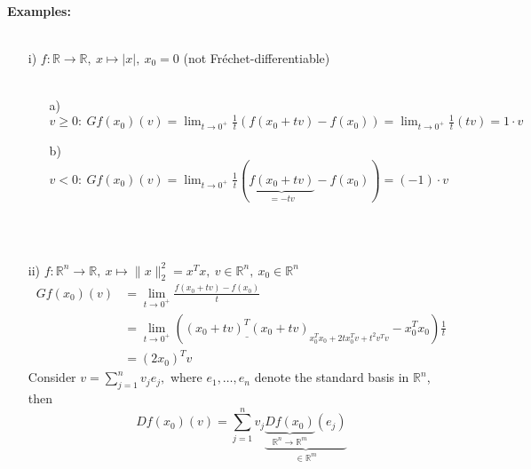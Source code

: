 \begin{frame}
~\\
\textbf{Examples:}\\~\\
\begin{itemize}
	\item [i)]
	$f:\mathbb{R}\rightarrow\mathbb{R},~x\mapsto |x|,~x_0=0$ (not Fr\'{e}chet-differentiable)\\~\\
	{\color{cyan}
	\begin{itemize}
		\item [\color{cyan}a)]\color{cyan}
		$v\geq 0:~Gf(x_0)(v)=\lim_{t\to 0^+}\frac{1}{t}(f(x_0+tv)-f(x_0))=\lim_{t\to 0^+}\frac{1}{t}(tv)=1\cdot v$
		\item [\color{cyan}b)]\color{cyan}
		$v<0:~Gf(x_0)(v)=\lim_{t\to 0^+}\frac{1}{t}(\underbrace{f(x_0+tv)}_{=-tv}-f(x_0))=(-1)\cdot v$
	\end{itemize}
}
~\\~\\
	\item [ii)]
	$f:\mathbb{R}^n\rightarrow\mathbb{R},~x\mapsto \|x\|_2^2=x^Tx,~v\in\mathbb{R}^n,~x_0\in\mathbb{R}^n$
	{\color{cyan}
	\begin{align*}
	Gf(x_0)(v)&=\lim_{t\to 0^+}\frac{f(x_0+tv)-f(x_0)}{t}\\
	&=\lim_{t\to 0^+}(\underline{(x_0+tv)^T(x_0+tv)}_{x_0^Tx_0+2tx_0^Tv+t^2v^Tv}-x_0^Tx_0)\frac{1}{t}\\
	&=(2x_0)^Tv
	\end{align*}
	Consider $v=\sum_{j=1}^n v_je_j,$ where $e_1,\dots,e_n$ denote the standard basis in $\mathbb{R}^n$, then
	$$
	Df(x_0)(v)=\sum_{j=1}^n v_j\underbrace{\underbrace{Df(x_0)}_{\mathbb{R}^n\to\mathbb{R}^m}(e_j)}_{\in\mathbb{R}^m}
	$$
	}
\end{itemize}

\end{frame}

